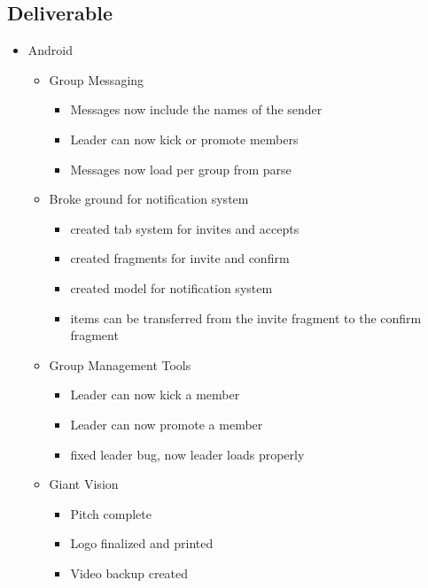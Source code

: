 \subsection{Deliverable}
\begin{itemize}
	\item Android
	\begin{itemize}
		\item Group Messaging
		\begin{itemize}
			\item Messages now include the names of the sender
			\item Leader can now kick or promote members
			\item Messages now load per group from parse
		\end{itemize}
		\item Broke ground for notification system
		\begin{itemize}
			\item created tab system for invites and accepts
			\item created fragments for invite and confirm
			\item created model for notification system
			\item items can be transferred from the invite fragment to the confirm fragment
		\end{itemize}
		\item Group Management Tools
		\begin{itemize}
			\item Leader can now kick a member
			\item Leader can now promote a member
			\item fixed leader bug, now leader loads properly
		\end{itemize}
		\item Giant Vision
		\begin{itemize}
			\item Pitch complete
			\item Logo finalized and printed
			\item Video backup created
		\end{itemize}
	\end{itemize}
\end{itemize}
